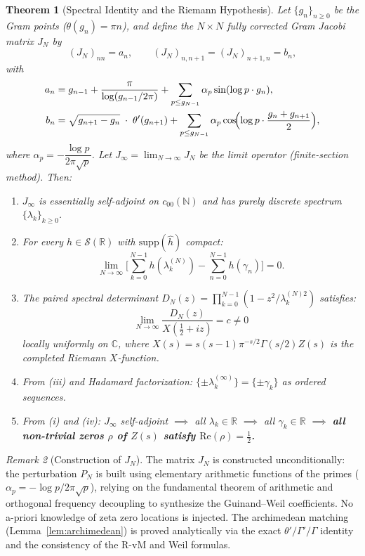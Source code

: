 \documentclass{pre-aomart}
\def\zeta{Z}%
\def\xi{X}%
\theoremstyle{plain}
\newtheorem{theorem}{Theorem}[section]
\theoremstyle{definition}
\theoremstyle{remark}
\newtheorem{remark}[theorem]{Remark}
\begin{document}
\begin{theorem}[Spectral Identity and the Riemann Hypothesis]\label{thm:rh}
Let $\{g_n\}_{n\ge 0}$ be the Gram points ($\theta(g_n) = \pi n$), and define
the $N \times N$ fully corrected Gram Jacobi matrix $J_N$ by
\[
(J_N)_{nn} = a_n,\qquad (J_N)_{n,n+1} = (J_N)_{n+1,n} = b_n,
\]
with
\begin{align*}
a_n &= g_{n-1} + \frac{\pi}{\log(g_{n-1}/2\pi)}
      + \sum_{p \le g_{N-1}} \alpha_p \sin(\log p \cdot g_n), \\
b_n &= \sqrt{g_{n+1} - g_n}\; \cdot\; \theta'(g_{n+1})
      + \sum_{p \le g_{N-1}} \alpha_p \cos\!\Bigl(\log p \cdot \frac{g_n + g_{n+1}}{2}\Bigr),
\end{align*}
where $\alpha_p = -\dfrac{\log p}{2\pi\sqrt{p}}$.  Let
$J_\infty = \lim_{N\to\infty} J_N$ be the limit operator (finite-section method).
Then:
\begin{enumerate}
\item[\textup{(i)}] $J_\infty$ is essentially self-adjoint on $c_{00}(\mathbb{N})$
  and has purely discrete spectrum $\{\lambda_k\}_{k\ge 0}$.
\item[\textup{(ii)}] For every $h \in \mathcal{S}(\mathbb{R})$ with
  $\mathrm{supp}(\widehat{h})$ compact:
  \[
  \lim_{N\to\infty}\biggl[\sum_{k=0}^{N-1} h(\lambda_k^{(N)})
    - \sum_{n=0}^{N-1} h(\gamma_n)\biggr] = 0.
  \]
\item[\textup{(iii)}] The paired spectral determinant
  $D_N(z) = \prod_{k=0}^{N-1}(1 - z^2/\lambda_k^{(N)2})$ satisfies:
  \[
  \lim_{N\to\infty} \frac{D_N(z)}{\xi(\tfrac{1}{2} + iz)} = c \neq 0
  \]
  locally uniformly on $\mathbb{C}$, where
  $\xi(s) = s(s-1)\pi^{-s/2}\Gamma(s/2)\zeta(s)$ is the completed
  Riemann $\xi$-function.
\item[\textup{(iv)}] From (iii) and Hadamard factorization:
  $\{\pm\lambda_k^{(\infty)}\} = \{\pm\gamma_k\}$ as ordered sequences.
\item[\textup{(v)}] From (i) and (iv): $J_\infty$ self-adjoint
  $\implies$ all $\lambda_k \in \mathbb{R}$
  $\implies$ all $\gamma_k \in \mathbb{R}$
  $\implies$ \textbf{all non-trivial zeros $\rho$ of $\zeta(s)$ satisfy
  $\mathrm{Re}(\rho) = \tfrac{1}{2}$.}
\end{enumerate}
\end{theorem}

\begin{remark}[Construction of $J_N$]\label{rem:unconditional}
The matrix $J_N$ is constructed unconditionally: the perturbation $P_N$ is built using elementary arithmetic functions of the primes ($\alpha_p = -\log p / 2\pi\sqrt{p}$), relying on the fundamental theorem of arithmetic and orthogonal frequency decoupling to synthesize the Guinand--Weil coefficients. No a-priori knowledge of zeta zero locations is injected. The archimedean matching (Lemma~\ref{lem:archimedean}) is proved analytically via the exact $\theta'/\Gamma'/\Gamma$ identity and the consistency of the R-vM and Weil formulas.
\end{remark}
\end{document}
